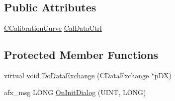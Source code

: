 \subsection*{Public Attributes}
\begin{DoxyCompactItemize}
\item 
\hyperlink{classCCalibrationCurve}{CCalibrationCurve} \hyperlink{classCDlgBarControl_a40b56a020c640711be2c8a8d0b5a8b7b}{CalDataCtrl}
\end{DoxyCompactItemize}
\subsection*{Protected Member Functions}
\begin{DoxyCompactItemize}
\item 
virtual void \hyperlink{classCDlgBarControl_a6132e33aad509e18fb8c1faa215a87c2}{DoDataExchange} (CDataExchange $\ast$pDX)
\item 
afx\_\-msg LONG \hyperlink{classCDlgBarControl_a6aeaaffeb68852948505ee0c42f08c4e}{OnInitDialog} (UINT, LONG)
\end{DoxyCompactItemize}
